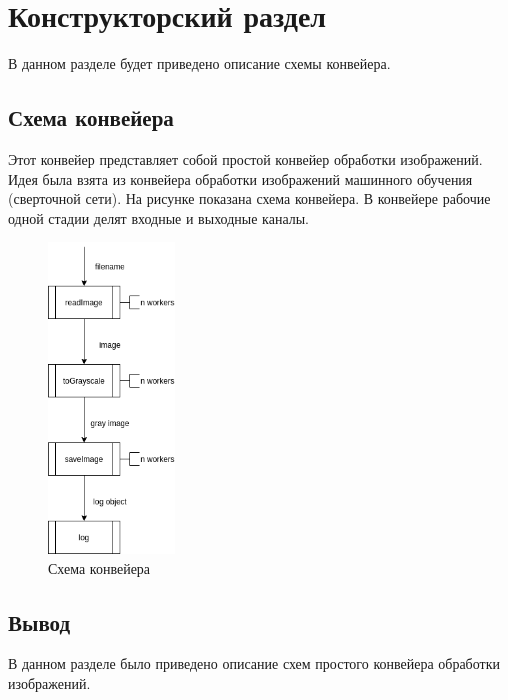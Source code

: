 \chapter{Конструкторский раздел}
\label{cha:design}

В данном разделе будет приведено описание схемы конвейера.

\section{Схема конвейера}

Этот конвейер представляет собой простой конвейер обработки изображений.
Идея была взята из конвейера обработки изображений машинного обучения (сверточной сети).
На рисунке показана схема конвейера.
В конвейере рабочие одной стадии делят входные и выходные каналы.


\begin{figure}[h!]
    \centering
    \includegraphics[width=0.3\textwidth]{5/inc/d1.png}
    \caption{Схема конвейера}
    \label{fig:2.2}
\end{figure}



\section{Вывод}
В данном разделе было приведено описание схем простого конвейера обработки изображений.
